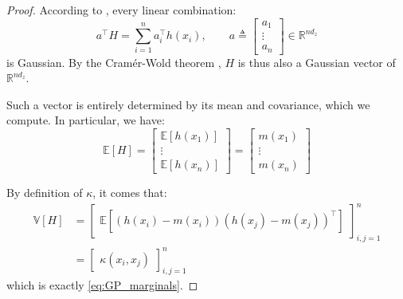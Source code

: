\begin{proof}
	According to , every linear combination:
	\begin{equation}
		a^\top H=\sum_{i=1}^na_i^\top h(x_i),\qquad a\triangleq\begin{bmatrix}a_1\\\vdots\\a_n\end{bmatrix}\in\mathbb{R}^{nd_z}
	\end{equation}
	is Gaussian. By the Cramér-Wold theorem \cite{bib:Cramér-Wold}, $H$ is thus also a Gaussian vector of $\mathbb{R}^{nd_z}$.

	Such a vector is entirely determined by its mean and covariance, which we compute. In particular, we have:
	\begin{equation}
		\mathbb{E}[H]=\begin{bmatrix}\mathbb{E}[h(x_1)]\\\vdots\\\mathbb{E}[h(x_n)]\end{bmatrix}=\begin{bmatrix}m(x_1)\\\vdots\\m(x_n)\end{bmatrix}
	\end{equation}

	By definition of $\kappa$, it comes that:
	\begin{equation}
		\begin{aligned}
		\mathbb{V}[H]&=\begin{bmatrix}
		\mathbb{E}\left[(h(x_i)-m(x_i))(h(x_j)-m(x_j))^\top\right]
		\end{bmatrix}_{i,j=1}^n\\
		&=\begin{bmatrix}
		\kappa(x_i,x_j)
		\end{bmatrix}_{i,j=1}^n
		\end{aligned}
	\end{equation}
	which is exactly \eqref{eq:GP_marginals}.
\end{proof}

